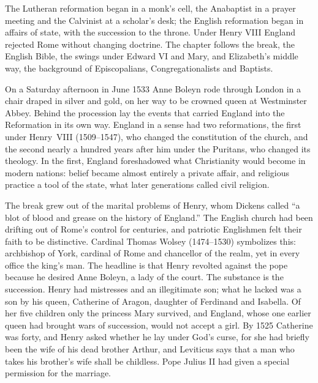 
\begin{inbrief}
The Lutheran reformation began in a monk's cell, the Anabaptist in a prayer meeting and the Calvinist
at a scholar's desk; the English reformation began in affairs of state, with the succession to the
throne. Under Henry VIII England rejected Rome without changing doctrine. The chapter follows the
break, the English Bible, the swings under Edward VI and Mary, and Elizabeth's middle way, the
background of Episcopalians, Congregationalists and Baptists.
\end{inbrief}

On a Saturday afternoon in June 1533 Anne Boleyn rode through London in a chair draped in silver and
gold, on her way to be crowned queen at Westminster Abbey. Behind the procession lay the events that
carried England into the Reformation in its own way. England in a sense had two reformations, the first under Henry~VIII (1509--1547), who changed the constitution of the church, and the second nearly a hundred years after him under the Puritans, who changed its theology. In the first, England foreshadowed what Christianity would become in modern nations: belief
became almost entirely a private affair, and religious practice a tool of the state,
what later generations called civil religion.

The break grew out of the marital problems of Henry, whom Dickens called ``a blot of blood and grease
on the history of England.'' The English church had been drifting out of Rome's control for centuries,
and patriotic Englishmen felt their faith to be distinctive. Cardinal Thomas Wolsey (1474--1530)
symbolizes this: archbishop of York, cardinal of Rome and chancellor of the realm, yet in every office
the king's man. The headline is that Henry revolted against the pope because he desired Anne Boleyn, a
lady of the court. The substance is the succession. Henry had mistresses and an illegitimate son;
what he lacked was a son by his queen, Catherine of Aragon, daughter of Ferdinand and Isabella. Of
her five children only the princess Mary survived, and England, whose one earlier queen had brought
wars of succession, would not accept a girl. By 1525 Catherine was forty, and Henry asked whether he
lay under God's curse, for she had briefly been the wife of his dead brother Arthur, and Leviticus
says that a man who takes his brother's wife shall be childless. Pope Julius II had given a special
permission for the marriage.

